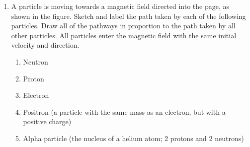 \begin{enumerate}[itemsep=6pt]
\begin{enumerate}[itemsep=3pt]
  \item The parallel plates of the velocity selector are separated by
    \SI{12.0}{\milli\metre} and have an electric potential difference across
    them of \SI{360}\volt. If a magnetic field of strength \SI{.100}{\tesla} is
    applied at right angles to the electric field, what is the speed of the
    particles that will be selected to pass on the mass spectrometer?
    
  \item When these particles then enter the mass spectrometer, which shares a
    magnetic field with the velocity selector, the radius of the resulting
    circular path followed by the particles is \SI{6.26}{\centi\metre}. What is
    the mass of the charged particles?
  \end{enumerate}

  
\item A particle is moving towards a magnetic field directed into the page, as
  shown in the figure. Sketch and label the path taken by each of the following
  particles. Draw all of the pathways in proportion to the path taken by all
  other particles. All particles enter the magnetic field with the same initial
  velocity and direction.
  \begin{center}
  \end{center}
  \begin{enumerate}[itemsep=3pt]
  \item Neutron
  \item Proton
  \item Electron
  \item Positron (a particle with the same mass as an electron, but with a
    positive charge)
  \item Alpha particle (the nucleus of a helium atom; 2 protons and 2
    neutrons)
  \end{enumerate}
  

\end{enumerate}
